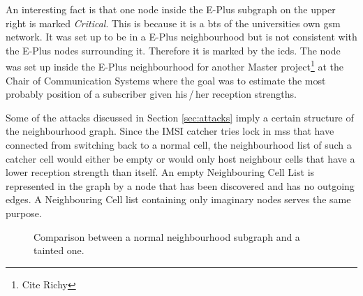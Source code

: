 An interesting fact is that one node inside the E-Plus subgraph on the upper right is marked \emph{Critical}.
This is because it is a \gls{bts} of the universities own \gls{gsm} network.
It was set up to be in a E-Plus neighbourhood but is not consistent with the E-Plus nodes surrounding it.
Therefore it is marked by the \gls{icds}.
The node was set up inside the E-Plus neighbourhood for another Master project\footnote{Cite Richy} at the Chair of Communication Systems where the goal was to estimate the most probably position of a subscriber given his\,/\,her reception strengths.

Some of the attacks discussed in Section \ref{sec:attacks} imply a certain structure of the neighbourhood graph.
Since the IMSI catcher tries lock in \glspl{ms} that have connected from switching back to a normal cell, the neighbourhood list of such a catcher cell would either be empty or would only host neighbour cells that have a lower reception strength than itself.
An empty Neighbouring Cell List is represented in the graph by a node that has been discovered and has no outgoing edges.
A Neighbouring Cell list containing only imaginary nodes serves the same purpose.
\begin{figure}
\centering
{}
\caption{Comparison between a normal neighbourhood subgraph and a tainted one.}
\label{fig:structure_comparison}
\end{figure}
